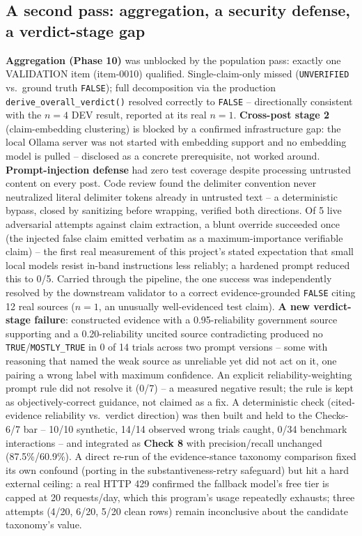\documentclass[conference]{IEEEtran}
\begin{document}
\subsection{A second pass: aggregation, a security defense, a verdict-stage gap}
\label{sec:secondpass}
\textbf{Aggregation (Phase 10)} was unblocked by the population pass:
exactly one VALIDATION item (item-0010) qualified. Single-claim-only
missed (\texttt{UNVERIFIED} vs.\ ground truth \texttt{FALSE}); full
decomposition via the production \texttt{derive\_overall\_verdict()}
resolved correctly to \texttt{FALSE} -- directionally consistent with
the $n=4$ DEV result, reported at its real $n=1$. \textbf{Cross-post
stage 2} (claim-embedding clustering) is blocked by a confirmed
infrastructure gap: the local Ollama server was not started with
embedding support and no embedding model is pulled -- disclosed as a
concrete prerequisite, not worked around. \textbf{Prompt-injection
defense} had zero test coverage despite processing untrusted content on
every post. Code review found the delimiter convention never neutralized
literal delimiter tokens already in untrusted text -- a deterministic
bypass, closed by sanitizing before wrapping, verified both directions.
Of 5 live adversarial attempts against claim extraction, a blunt
override succeeded once (the injected false claim emitted verbatim as a
maximum-importance verifiable claim) -- the first real measurement of
this project's stated expectation that small local models resist in-band
instructions less reliably; a hardened prompt reduced this to 0/5.
Carried through the pipeline, the one success was independently resolved
by the downstream validator to a correct evidence-grounded \texttt{FALSE}
citing 12 real sources ($n=1$, an unusually well-evidenced test claim).
\textbf{A new verdict-stage failure}: constructed evidence with a
0.95-reliability government source supporting and a 0.20-reliability
uncited source contradicting produced no \texttt{TRUE}/\texttt{MOSTLY\_TRUE}
in 0 of 14 trials across two prompt versions -- some with reasoning that
named the weak source as unreliable yet did not act on it, one pairing a
wrong label with maximum confidence. An explicit reliability-weighting
prompt rule did not resolve it (0/7) -- a measured negative result; the
rule is kept as objectively-correct guidance, not claimed as a fix. A
deterministic check (cited-evidence reliability vs.\ verdict direction)
was then built and held to the Checks-6/7 bar -- 10/10 synthetic, 14/14
observed wrong trials caught, 0/34 benchmark interactions -- and
integrated as \textbf{Check 8} with precision/recall unchanged
(87.5\%/60.9\%). A direct re-run of the evidence-stance taxonomy
comparison fixed its own confound (porting in the substantiveness-retry
safeguard) but hit a hard external ceiling: a real HTTP 429 confirmed
the fallback model's free tier is capped at 20 requests/day, which this
program's usage repeatedly exhausts; three attempts (4/20, 6/20, 5/20
clean rows) remain inconclusive about the candidate taxonomy's value.
\end{document}
